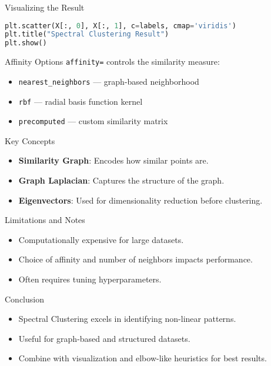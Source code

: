 \documentclass[mathserif,20pt,xcolor=table,compress,aspectratio=169]{beamer}
\begin{document}
\begin{frame}[fragile]{Visualizing the Result}
\begin{lstlisting}[language=Python]
plt.scatter(X[:, 0], X[:, 1], c=labels, cmap='viridis')
plt.title("Spectral Clustering Result")
plt.show()
\end{lstlisting}
\end{frame}

\begin{frame}{Affinity Options}
\texttt{affinity=} controls the similarity measure:
\begin{itemize}
    \item \texttt{nearest\_neighbors} — graph-based neighborhood
    \item \texttt{rbf} — radial basis function kernel
    \item \texttt{precomputed} — custom similarity matrix
\end{itemize}
\end{frame}

\begin{frame}{Key Concepts}
\begin{itemize}
    \item \textbf{Similarity Graph}: Encodes how similar points are.
    \item \textbf{Graph Laplacian}: Captures the structure of the graph.
    \item \textbf{Eigenvectors}: Used for dimensionality reduction before clustering.
\end{itemize}
\end{frame}

\begin{frame}{Limitations and Notes}
\begin{itemize}
    \item Computationally expensive for large datasets.
    \item Choice of affinity and number of neighbors impacts performance.
    \item Often requires tuning hyperparameters.
\end{itemize}
\end{frame}

\begin{frame}{Conclusion}
\begin{itemize}
    \item Spectral Clustering excels in identifying non-linear patterns.
    \item Useful for graph-based and structured datasets.
    \item Combine with visualization and elbow-like heuristics for best results.
\end{itemize}
\end{frame}
\end{document}
